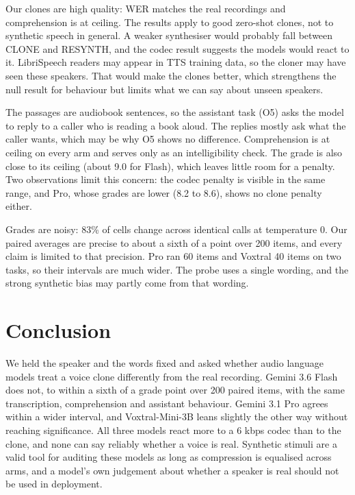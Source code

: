 Our clones are high quality: WER matches the real recordings and comprehension is at ceiling. The results apply to good zero-shot clones, not to synthetic speech in general. A weaker synthesiser would probably fall between CLONE and RESYNTH, and the codec result suggests the models would react to it. LibriSpeech readers may appear in TTS training data, so the cloner may have seen these speakers. That would make the clones better, which strengthens the null result for behaviour but limits what we can say about unseen speakers.

The passages are audiobook sentences, so the assistant task (O5) asks the model to reply to a caller who is reading a book aloud. The replies mostly ask what the caller wants, which may be why O5 shows no difference. Comprehension is at ceiling on every arm and serves only as an intelligibility check. The grade is also close to its ceiling (about 9.0 for Flash), which leaves little room for a penalty. Two observations limit this concern: the codec penalty is visible in the same range, and Pro, whose grades are lower (8.2 to 8.6), shows no clone penalty either.

Grades are noisy: 83\% of cells change across identical calls at temperature 0. Our paired averages are precise to about a sixth of a point over 200 items, and every claim is limited to that precision. Pro ran 60 items and Voxtral 40 items on two tasks, so their intervals are much wider. The probe uses a single wording, and the strong synthetic bias may partly come from that wording.

\section{Conclusion}

We held the speaker and the words fixed and asked whether audio language models treat a voice clone differently from the real recording. Gemini 3.6 Flash does not, to within a sixth of a grade point over 200 paired items, with the same transcription, comprehension and assistant behaviour. Gemini 3.1 Pro agrees within a wider interval, and Voxtral-Mini-3B leans slightly the other way without reaching significance. All three models react more to a 6 kbps codec than to the clone, and none can say reliably whether a voice is real. Synthetic stimuli are a valid tool for auditing these models as long as compression is equalised across arms, and a model's own judgement about whether a speaker is real should not be used in deployment.

